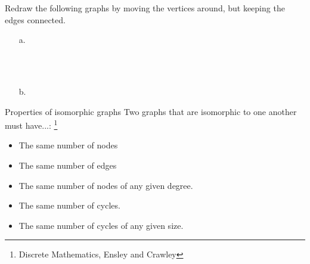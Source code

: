    \begin{questionNOGRADE}{\thequestion}
        Redraw the following graphs by moving the vertices around,
        but keeping the edges connected.

        \begin{itemize}
            \item[a.] 
             ~\\ ~\\

            \item[b.]
        \end{itemize}
    \end{questionNOGRADE}

    \newpage

    \begin{intro}{Properties of isomorphic graphs}
        Two graphs that are isomorphic to one another must have...:
        \footnote{Discrete Mathematics, Ensley and Crawley} 
        \begin{itemize}
            \item   The same number of nodes
            \item   The same number of edges
            \item   The same number of nodes of any given degree.
            \item   The same number of cycles.
            \item   The same number of cycles of any given size.
        \end{itemize}
    \end{intro}

